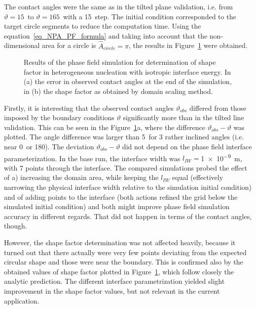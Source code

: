 The contact angles were the same as in the tilted plane validation, i.e. from $\vartheta=15$\textdegree~to $\vartheta=165$\textdegree~with a 15\textdegree~step. The initial condition corresponded to the target circle segments to reduce the computation time. Using the equation~\eqref{eq_NPA_PF_formula} and taking into account that the non-dimensional area for a circle is $\hat{A}_{circle}=\pi$, the results in Figure~\ref{fig_result_NPA_PF_S_iso} were obtained.
\begin{figure}
	\centering
	\caption{Results of the phase field simulation for determination of shape factor in heterogeneous nucleation with isotropic interface energy. In (a) the error in observed contact angles at the end of the simulation, in (b) the shape factor as obtained by domain scaling method.}
	\label{fig_result_NPA_PF_S_iso}
\end{figure}

Firstly, it is interesting that the observed contact angles $\vartheta_{obs}$ differed from those imposed by the boundary conditions $\vartheta$ significantly more than in the tilted line validation. This can be seen in the Figure~\ref{fig_result_NPA_PF_S_iso}a, where the difference $\vartheta_{obs}-\vartheta$ was plotted. The angle difference was larger than 5\textdegree~for 3 rather inclined angles (i.e. near 0\textdegree~or 180\textdegree). The deviation $\vartheta_{obs}-\vartheta$ did not depend on the phase field interface parameterization. In the base run, the interface width was $l_{IW}=$\qty{1e-9}{\m}, with 7 points through the interface. The compared simulations probed the effect of a) increasing the domain area, while keeping the $l_{IW}$ equal (effectively narrowing the physical interface width relative to the simulation initial condition) and of adding points to the interface (both actions refined the grid below the simulated initial condition) and both might improve phase field simulation accuracy in different regards. That did not happen in terms of the contact angles, though.

However, the shape factor determination was not affected heavily, because it turned out that there actually were very few points deviating from the expected circular shape and those were near the boundary. This is confirmed also by the obtained values of shape factor plotted in Figure~\ref{fig_result_NPA_PF_S_iso}, which follow closely the analytic prediction. The different interface parametrization yielded slight improvement in the shape factor values, but not relevant in the current application.

